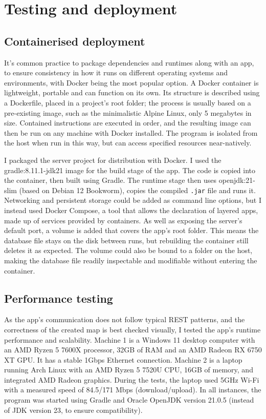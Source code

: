 \chapter{Testing and deployment}

\section{Containerised deployment}
It's common practice to package dependencies and runtimes along with an app, to ensure consistency in how it runs on different operating systems and environments, with Docker being the most popular option. A Docker container is lightweight, portable and can function on its own. Its structure is described using a Dockerfile, placed in a project's root folder; the process is usually based on a pre-existing image, such as the minimalistic Alpine Linux, only 5 megabytes in size. Contained instructions are executed in order, and the resulting image can then be run on any machine with Docker installed. The program is isolated from the host when run in this way, but can access specified resources near-natively.

I packaged the server project for distribution with Docker. I used the gradle:8.11.1-jdk21 image for the build stage of the app. The code is copied into the container, then built using Gradle. The runtime stage then uses openjdk:21-slim (based on Debian 12 Bookworm), copies the compiled \verb|.jar| file and runs it. Networking and persistent storage could be added as command line options, but I instead used Docker Compose, a tool that allows the declaration of layered apps, made up of services provided by containers. As well as exposing the server's default port, a volume is added that covers the app's root folder. This means the database file stays on the disk between runs, but rebuilding the container still deletes it as expected. The volume could also be bound to a folder on the host, making the database file readily inspectable and modifiable without entering the container.

\section{Performance testing}

As the app's communication does not follow typical REST patterns, and the correctness of the created map is best checked visually, I tested the app's runtime performance and scalability.
Machine 1 is a Windows 11 desktop computer with an AMD Ryzen 5 7600X processor, 32GB of RAM and an AMD Radeon RX 6750 XT GPU. It has a stable 1Gbps Ethernet connection. Machine 2 is a laptop running Arch Linux with an AMD Ryzen 5 7520U CPU, 16GB of memory, and integrated AMD Radeon graphics. During the tests, the laptop used 5GHz Wi-Fi with a measured speed of 84.5/171 Mbps (download/upload). In all instances, the program was started using Gradle and Oracle OpenJDK version 21.0.5 (instead of JDK version 23, to ensure compatibility). 


